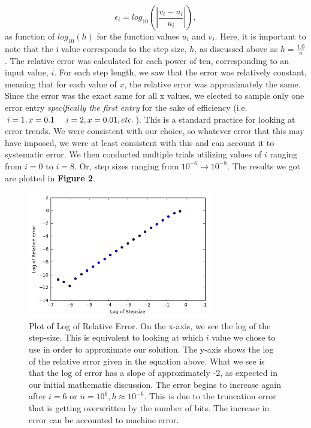 \documentclass{article}
\begin{document}
\[
\epsilon_i=log_{10}\left(\left|\frac{v_i-u_i}
{u_i}\right|\right),
\]
as function of $log_{10}(h)$ for the function values $u_i$ and $v_i$. Here, it is important to note that the i value corresponds to the step size, $h$, as discussed above as $h = \frac{1.0}{n}$. The relative error was calculated for each power of ten, corresponding to an input value, $i$.
For each step length, we saw that the error was relatively constant, meaning that for each value of $x$, the relative error was approximately the same. Since the error was the exact same for all x values, we elected to sample only one error entry \textit{ specifically the first entry} for the sake of efficiency (i.e. $i=1, x= 0.1 \hspace{0.5cm} i=2, x = 0.01, etc.$). This is a standard practice for looking at error trends. We were consistent with our choice, so whatever error that this may have imposed, we were at least consistent with this and can account it to systematic error. We then conducted multiple trials utilizing values of $i$ ranging from $i=0$ to $i=8$. Or, step sizes ranging from $10^{-6} \rightarrow 10^{-8}$. The results we got are plotted in \textbf{Figure 2}.

\begin{figure}[h!]
	\centering
	\includegraphics[width=8cm]{PHY480_P1_RerrvSs.png}
	\caption{Plot of Log of Relative Error. On the x-axis, we see the log of the step-size. This is equivalent to looking at which $i$ value we chose to use in order to approximate our solution. The y-axis shows the log of the relative error given in the equation above. What we see is that the log of error has a slope of approximately -2, as expected in our initial mathematic discussion. The error begins to increase again after $i=6$ or $n=10^{6}, h \approx 10^{-6}$. This is due to the truncation error that is getting overwritten by the number of bits. The increase in error can be accounted to machine error.}
	\label{fig:errorplot}
\end{figure}
\end{document}
